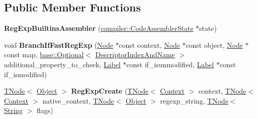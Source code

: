 \subsection*{Public Member Functions}
\begin{DoxyCompactItemize}
\item 
\mbox{\label{classv8_1_1internal_1_1RegExpBuiltinsAssembler_ad310b869e646b9dd74bb93acc752623b}} 
{\bfseries Reg\+Exp\+Builtins\+Assembler} (\mbox{\hyperlink{classv8_1_1internal_1_1compiler_1_1CodeAssemblerState}{compiler\+::\+Code\+Assembler\+State}} $\ast$state)
\item 
\mbox{\label{classv8_1_1internal_1_1RegExpBuiltinsAssembler_af675f1a735af6a0e611e957933cc1b2e}} 
void {\bfseries Branch\+If\+Fast\+Reg\+Exp} (\mbox{\hyperlink{classv8_1_1internal_1_1compiler_1_1Node}{Node}} $\ast$const context, \mbox{\hyperlink{classv8_1_1internal_1_1compiler_1_1Node}{Node}} $\ast$const object, \mbox{\hyperlink{classv8_1_1internal_1_1compiler_1_1Node}{Node}} $\ast$const map, \mbox{\hyperlink{classv8_1_1base_1_1Optional}{base\+::\+Optional}}$<$ \mbox{\hyperlink{structv8_1_1internal_1_1CodeStubAssembler_1_1DescriptorIndexAndName}{Descriptor\+Index\+And\+Name}} $>$ additional\+\_\+property\+\_\+to\+\_\+check, \mbox{\hyperlink{classv8_1_1internal_1_1compiler_1_1CodeAssemblerLabel}{Label}} $\ast$const if\+\_\+isunmodified, \mbox{\hyperlink{classv8_1_1internal_1_1compiler_1_1CodeAssemblerLabel}{Label}} $\ast$const if\+\_\+ismodified)
\item 
\mbox{\label{classv8_1_1internal_1_1RegExpBuiltinsAssembler_addaaee8715a44bd54f0258f18b0faec8}} 
\mbox{\hyperlink{classv8_1_1internal_1_1compiler_1_1TNode}{T\+Node}}$<$ \mbox{\hyperlink{classv8_1_1internal_1_1Object}{Object}} $>$ {\bfseries Reg\+Exp\+Create} (\mbox{\hyperlink{classv8_1_1internal_1_1compiler_1_1TNode}{T\+Node}}$<$ \mbox{\hyperlink{classv8_1_1internal_1_1Context}{Context}} $>$ context, \mbox{\hyperlink{classv8_1_1internal_1_1compiler_1_1TNode}{T\+Node}}$<$ \mbox{\hyperlink{classv8_1_1internal_1_1Context}{Context}} $>$ native\+\_\+context, \mbox{\hyperlink{classv8_1_1internal_1_1compiler_1_1TNode}{T\+Node}}$<$ \mbox{\hyperlink{classv8_1_1internal_1_1Object}{Object}} $>$ regexp\+\_\+string, \mbox{\hyperlink{classv8_1_1internal_1_1compiler_1_1TNode}{T\+Node}}$<$ \mbox{\hyperlink{classv8_1_1internal_1_1String}{String}} $>$ flags)

\end{DoxyCompactItemize}
